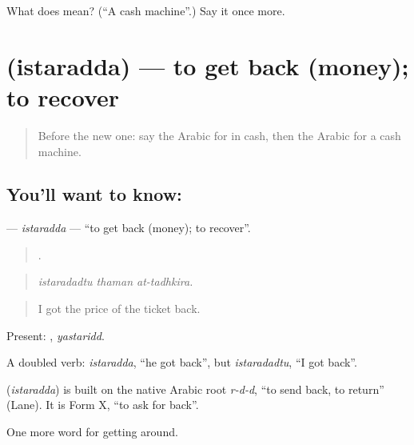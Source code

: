 \begin{tcolorbox}[breakable,colback=teal!4,colframe=teal!35!black,title={Before you move on}]
What does   mean? (\textquotedblleft{}A cash machine\textquotedblright{}.) Say it once more.
\end{tcolorbox}
\section[\texorpdfstring{\ar{استرد} (istaradda)}{استرد (istaradda)}]{ (istaradda) — to get back (money); to recover}

\label{lesson:AR-C453-istaradda}



\begin{quote}
Before the new one: say the Arabic for in cash, then the Arabic for a cash machine.
\end{quote}

\subsection*{You'll want to know: }
\textbf{} — \emph{istaradda} — \textquotedblleft{}to get back (money); to recover\textquotedblright{}.

\begin{quote}
  .
\end{quote}

\begin{quote}
\emph{istaradadtu thaman at-tadhkira.}
\end{quote}

\begin{quote}
I got the price of the ticket back.
\end{quote}

Present: , \emph{yastaridd}.

A doubled verb: \emph{istaradda}, \textquotedblleft{}he got back\textquotedblright{}, but \emph{istaradadtu}, \textquotedblleft{}I got back\textquotedblright{}.

\begin{cousinweb}
\textbf{} (\emph{istaradda}) is built on the native Arabic root \emph{r-d-d}, \textquotedblleft{}to send back, to return\textquotedblright{} (Lane). It is Form X, \textquotedblleft{}to ask for back\textquotedblright{}.
\end{cousinweb}

\begin{grammarlens}[title={What you've built}]
One more word for getting around.
\end{grammarlens}


